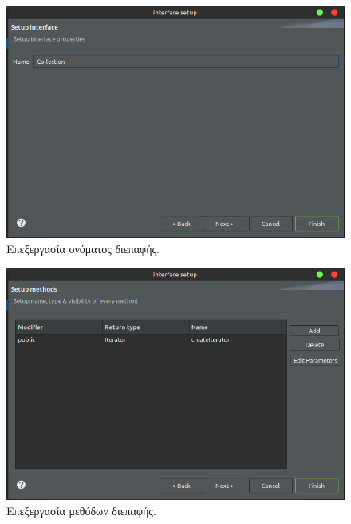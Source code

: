 \begin{figure}[H]
    \centering
    \includegraphics[width=1.0\textwidth]{Figures/edit_interface.png}
    \caption{Επεξεργασία ονόματος διεπαφής.}
    \label{fig:edit_interface}
\end{figure}
\begin{figure}[H]
    \centering
    \includegraphics[width=1.0\textwidth]{Figures/edit_interface_methods.png}
    \caption{Επεξεργασία μεθόδων διεπαφής.}
    \label{fig:edit_interface_methods}
\end{figure}
